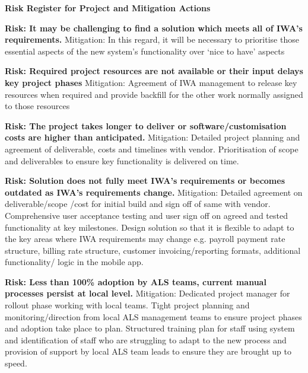 \documentclass[a4paper,Times New Roman 11pt]{article}
\begin{document}
\begin{samepage}
\textbf{Risk Register for Project and Mitigation Actions}

\noindent\makebox[\linewidth]{\rule{\textwidth}{0.4pt}}
\textbf{Risk: It may be challenging to find a solution which meets all of IWA’s requirements.}
\newline Mitigation: In this regard, it will be necessary to prioritise those essential aspects of the new system’s functionality over ‘nice to have’ aspects

\noindent\makebox[\linewidth]{\rule{\textwidth}{0.4pt}}
\textbf{Risk: Required project resources are not available or their input delays key project phases}
\newline Mitigation: Agreement of IWA management to release key resources when required and provide backfill for the other work normally assigned to those resources

\noindent\makebox[\linewidth]{\rule{\textwidth}{0.4pt}}
\textbf{Risk: The project takes longer to deliver or software/customisation costs are higher than anticipated.}
\newline Mitigation: Detailed project planning and agreement of deliverable, costs and timelines with vendor. Prioritisation of scope and deliverables to ensure key functionality is delivered on time. 

\noindent\makebox[\linewidth]{\rule{\textwidth}{0.4pt}}
\textbf{Risk: Solution does not fully meet IWA's requirements or becomes outdated as IWA's requirements change.}
\newline Mitigation: Detailed agreement on deliverable/scope /cost for initial build and sign off of same with vendor. Comprehensive user acceptance testing and user sign off on agreed and tested functionality at key milestones. Design solution so that it is flexible to adapt to the key areas where IWA requirements may change e.g. payroll payment rate structure, billing rate structure, customer invoicing/reporting formats, additional functionality/ logic in the mobile app.

\noindent\makebox[\linewidth]{\rule{\textwidth}{0.4pt}}
\textbf{Risk: Less than 100\% adoption by ALS teams, current manual processes persist at local level.}
\newline Mitigation: Dedicated project manager for rollout phase working with local teams. Tight project planning and monitoring/direction from local ALS management teams to ensure project phases and adoption take place to plan. Structured training plan for staff using system and identification of staff who are struggling to adapt to the new process and provision of support by local ALS team leads to ensure they are brought up to speed.


\end{samepage}
\end{document}
